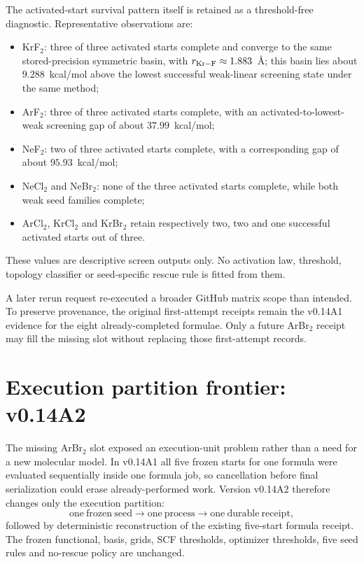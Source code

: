 The activated-start survival pattern itself is retained as a threshold-free diagnostic.  Representative observations are:
\begin{itemize}
\item KrF$_2$: three of three activated starts complete and converge to the same stored-precision symmetric basin, with $r_{\rm Kr-F}\approx1.883$~\AA; this basin lies about $9.288$~kcal/mol above the lowest successful weak-linear screening state under the same method;
\item ArF$_2$: three of three activated starts complete, with an activated-to-lowest-weak screening gap of about $37.99$~kcal/mol;
\item NeF$_2$: two of three activated starts complete, with a corresponding gap of about $95.93$~kcal/mol;
\item NeCl$_2$ and NeBr$_2$: none of the three activated starts complete, while both weak seed families complete;
\item ArCl$_2$, KrCl$_2$ and KrBr$_2$ retain respectively two, two and one successful activated starts out of three.
\end{itemize}
These values are descriptive screen outputs only.  No activation law, threshold, topology classifier or seed-specific rescue rule is fitted from them.

A later rerun request re-executed a broader GitHub matrix scope than intended.  To preserve provenance, the original first-attempt receipts remain the v0.14A1 evidence for the eight already-completed formulae.  Only a future ArBr$_2$ receipt may fill the missing slot without replacing those first-attempt records.

\section{Execution partition frontier: v0.14A2}
The missing ArBr$_2$ slot exposed an execution-unit problem rather than a need for a new molecular model.  In v0.14A1 all five frozen starts for one formula were evaluated sequentially inside one formula job, so cancellation before final serialization could erase already-performed work.  Version v0.14A2 therefore changes only the execution partition:
\begin{equation}
\mathrm{one\ frozen\ seed}\longrightarrow\mathrm{one\ process}\longrightarrow\mathrm{one\ durable\ receipt},
\end{equation}
followed by deterministic reconstruction of the existing five-start formula receipt.  The frozen functional, basis, grids, SCF thresholds, optimizer thresholds, five seed rules and no-rescue policy are unchanged.

